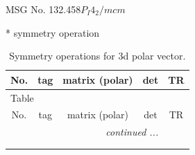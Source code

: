 \documentclass[fleqn,8pt]{jsarticle}
\begin{document}
\setcounter{MaxMatrixCols}{32}

\renewcommand{\tablename}{Table~}
\renewcommand{\figurename}{Figure~}
\begin{center}
\LARGE
MSG No. 132.458\quad$P_{I}4_{2}/mcm$
\end{center}
* symmetry operation
\renewcommand{\arraystretch}{1.3}
\begin{longtable}{ccccc}
\caption{Symmetry operations for 3d polar vector.}
 \\
 \hline \hline
No. & tag & matrix (polar) & det & TR \\ \hline \endfirsthead

\multicolumn{4}{l}{\tablename\ \thetable{}} \\
 \hline \hline
No. & tag & matrix (polar) & det & TR \\ \hline \endhead

 \hline \hline
\multicolumn{4}{r}{\footnotesize\it continued ...} \\ \endfoot

 \hline \hline
\multicolumn{4}{r}{} \\ \endlastfoot


\end{longtable}
\end{document}
